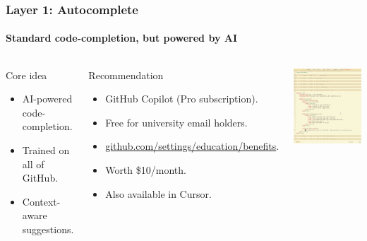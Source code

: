 \documentclass[aspectratio=169]{beamer}
\begin{document}
\begin{frame}
    \frametitle{Layer 1: Autocomplete}
    \framesubtitle{Standard code-completion, but powered by AI}
    
    \begin{columns}
        \begin{block}{Core idea}
            \begin{itemize}
                \item AI-powered code-completion.
                \item Trained on all of GitHub.
                \item Context-aware suggestions.
            \end{itemize}
        \end{block}
        
        \begin{block}{Recommendation}
            \begin{itemize}
                \item GitHub Copilot (Pro subscription).
                \item Free for university email holders.
                \item \url{github.com/settings/education/benefits}.
                \item Worth \$10/month.
                \item Also available in Cursor.
            \end{itemize}
        \end{block}

        \includegraphics[width=\textwidth]{figures/copilot_screenshot.png}
    \end{columns}
\end{frame}
\end{document}
